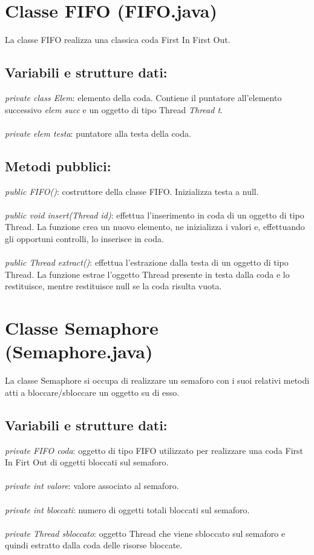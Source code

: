 \documentclass[10pt, a4paper]{article}
\begin{document}
\section{Classe FIFO (FIFO.java)}
La classe FIFO realizza una classica coda First In First Out.
\subsection{Variabili e strutture dati:}
\textit{private class Elem}: elemento della coda. Contiene il puntatore all'elemento successivo \textit{elem succ} e un oggetto di tipo Thread \textit{Thread t}.
\\\\
\textit{private elem testa}: puntatore alla testa della coda.
\subsection{Metodi pubblici:}
\textit{public FIFO()}: costruttore della classe FIFO. Inizializza testa a null.
\\\\
\textit{public void insert(Thread id)}: effettua l'inserimento in coda di un oggetto di tipo Thread. La funzione crea un nuovo elemento, ne inizializza i valori e, effettuando gli opportuni controlli, lo inserisce in coda.
\\\\
\textit{public Thread extract()}: effettua l'estrazione dalla testa di un oggetto di tipo Thread. La funzione estrae l'oggetto Thread presente in testa dalla coda e lo restituisce, mentre restituisce null se la coda risulta vuota.
\section{Classe Semaphore (Semaphore.java)}
La classe Semaphore si occupa di realizzare un semaforo con i suoi relativi metodi atti a bloccare/sbloccare un oggetto su di esso.
\subsection{Variabili e strutture dati:}
\textit{private FIFO coda}: oggetto di tipo FIFO utilizzato per realizzare una coda First In Firt Out di oggetti bloccati sul semaforo.
\\\\
\textit{private int valore}: valore associato al semaforo.
\\\\
\textit{private int bloccati}: numero di oggetti totali bloccati sul semaforo.
\\\\
\textit{private Thread sbloccato}: oggetto Thread che viene sbloccato sul semaforo e quindi estratto dalla coda delle risorse bloccate.
\end{document}
